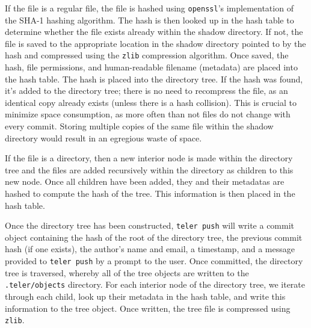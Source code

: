 \documentclass[11pt, letterpaper]{article}
\begin{document}
\begin{multicols}{2}
  If the file is a regular file, the file is hashed using
  \texttt{openssl}'s implementation of the SHA-1 hashing algorithm.
  The hash is then looked up in the hash table to determine whether
  the file exists already within the shadow directory. If not, the
  file is saved to the appropriate location in the shadow
  directory pointed to by the hash and compressed using the \texttt{zlib}
  compression algorithm. Once saved, the hash, file
  permissions, and human-readable filename (metadata) are placed into the hash
  table. The hash is placed into the directory tree. If the hash was found,
  it's added to the directory tree; there is no need
  to recompress the file, as an identical copy already exists (unless
  there is a hash collision). This is crucial to minimize space
  consumption, as more often than not files do not change with every
  commit. Storing multiple copies of the same file within the
  shadow directory would result in an egregious waste of space.

  If the file is a directory, then a new interior node is made
  within the directory tree and the files are added recursively within the
  directory as children to this new node. Once all children have
  been added, they and their metadatas are hashed to compute the hash of
  the tree. This information is then placed in the hash table.

  Once the directory tree has been constructed, \texttt{teler push}
  will write a commit object containing the hash of the root of the
  directory tree, the previous commit hash (if one exists), the
  author's name and email, a timestamp, and a message provided
  to \texttt{teler push} by a prompt to the user. Once committed, the
  directory tree is traversed, whereby all of the tree objects are
  written to the \texttt{.teler/objects} directory. For each interior
  node of the directory tree, we iterate through each child, look up
  their metadata in the hash table, and write this information to
  the tree object. Once written, the tree file is compressed using
  \texttt{zlib}.

  \begin{center}
    \begin{minipage}{.2\textwidth}
\end{minipage}
\end{center}
\end{multicols}
\end{document}
